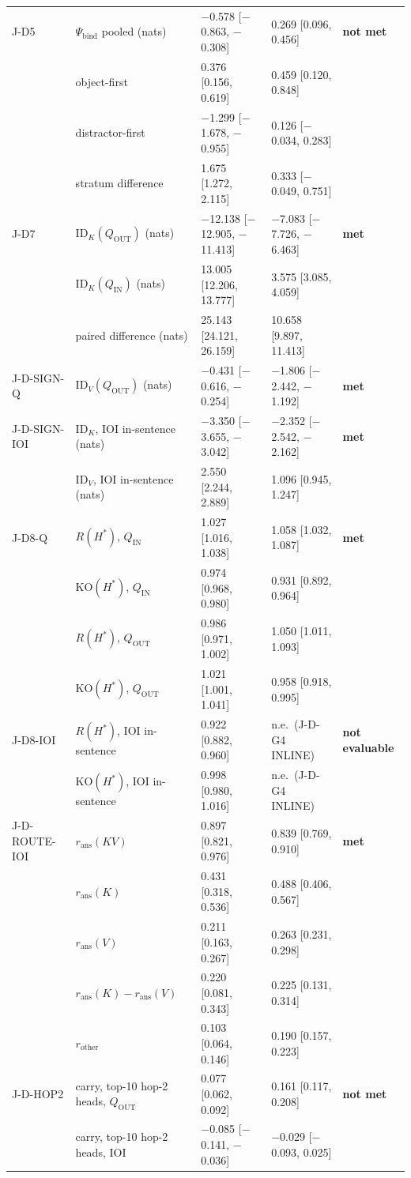 \begin{tabular}{@{}lllll@{}}
J-D5 & $\Psi_{\mathrm{bind}}$ pooled (nats) & $-$0.578 [$-$0.863, $-$0.308] & 0.269 [0.096, 0.456] & \textbf{not met} \\
 & object-first & 0.376 [0.156, 0.619] & 0.459 [0.120, 0.848] &  \\
 & distractor-first & $-$1.299 [$-$1.678, $-$0.955] & 0.126 [$-$0.034, 0.283] &  \\
 & stratum difference & 1.675 [1.272, 2.115] & 0.333 [$-$0.049, 0.751] &  \\
J-D7 & $\mathrm{ID}_K(Q_{\mathrm{OUT}})$ (nats) & $-$12.138 [$-$12.905, $-$11.413] & $-$7.083 [$-$7.726, $-$6.463] & \textbf{met} \\
 & $\mathrm{ID}_K(Q_{\mathrm{IN}})$ (nats) & 13.005 [12.206, 13.777] & 3.575 [3.085, 4.059] &  \\
 & paired difference (nats) & 25.143 [24.121, 26.159] & 10.658 [9.897, 11.413] &  \\
J-D-SIGN-Q & $\mathrm{ID}_V(Q_{\mathrm{OUT}})$ (nats) & $-$0.431 [$-$0.616, $-$0.254] & $-$1.806 [$-$2.442, $-$1.192] & \textbf{met} \\
J-D-SIGN-IOI & $\mathrm{ID}_K$, IOI in-sentence (nats) & $-$3.350 [$-$3.655, $-$3.042] & $-$2.352 [$-$2.542, $-$2.162] & \textbf{met} \\
 & $\mathrm{ID}_V$, IOI in-sentence (nats) & 2.550 [2.244, 2.889] & 1.096 [0.945, 1.247] &  \\
J-D8-Q & $R(H^*)$, $Q_{\mathrm{IN}}$ & 1.027 [1.016, 1.038] & 1.058 [1.032, 1.087] & \textbf{met} \\
 & $\mathrm{KO}(H^*)$, $Q_{\mathrm{IN}}$ & 0.974 [0.968, 0.980] & 0.931 [0.892, 0.964] &  \\
 & $R(H^*)$, $Q_{\mathrm{OUT}}$ & 0.986 [0.971, 1.002] & 1.050 [1.011, 1.093] &  \\
 & $\mathrm{KO}(H^*)$, $Q_{\mathrm{OUT}}$ & 1.021 [1.001, 1.041] & 0.958 [0.918, 0.995] &  \\
J-D8-IOI & $R(H^*)$, IOI in-sentence & 0.922 [0.882, 0.960] & n.e.\ (J-D-G4 INLINE) & \textbf{not evaluable} \\
 & $\mathrm{KO}(H^*)$, IOI in-sentence & 0.998 [0.980, 1.016] & n.e.\ (J-D-G4 INLINE) &  \\
J-D-ROUTE-IOI & $r_{\mathrm{ans}}(KV)$ & 0.897 [0.821, 0.976] & 0.839 [0.769, 0.910] & \textbf{met} \\
 & $r_{\mathrm{ans}}(K)$ & 0.431 [0.318, 0.536] & 0.488 [0.406, 0.567] &  \\
 & $r_{\mathrm{ans}}(V)$ & 0.211 [0.163, 0.267] & 0.263 [0.231, 0.298] &  \\
 & $r_{\mathrm{ans}}(K) - r_{\mathrm{ans}}(V)$ & 0.220 [0.081, 0.343] & 0.225 [0.131, 0.314] &  \\
 & $r_{\mathrm{other}}$ & 0.103 [0.064, 0.146] & 0.190 [0.157, 0.223] &  \\
J-D-HOP2 & carry, top-10 hop-2 heads, $Q_{\mathrm{OUT}}$ & 0.077 [0.062, 0.092] & 0.161 [0.117, 0.208] & \textbf{not met} \\
 & carry, top-10 hop-2 heads, IOI & $-$0.085 [$-$0.141, $-$0.036] & $-$0.029 [$-$0.093, 0.025] &  \\
\bottomrule
\end{tabular}


